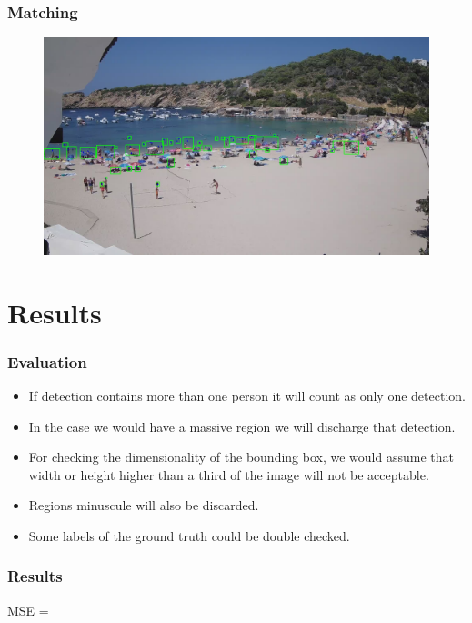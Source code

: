 \documentclass{beamer}
\begin{document}
\begin{frame}
    \frametitle{Matching}
    \begin{figure}
        \centering
        \includegraphics[width=\textwidth]{../gen/match/1660305600.jpg}
    \end{figure}
\end{frame}

\section{Results}

\begin{frame}
    \frametitle{Evaluation}
    \begin{itemize}
        
   
    \item If detection contains more than one person it will count as only one detection.
    \item In the case we would have a massive region we will discharge that detection.
    \item For checking the dimensionality of the bounding box, we would assume that width or height higher than a third of the image will not be acceptable.
    \item Regions minuscule will also be discarded.
    \item Some labels of the ground truth could be double checked.
\end{itemize}
\end{frame}

\begin{frame}
    \frametitle{Results}
    \newline \newline \newline
    MSE = 
\end{frame}
\end{document}
